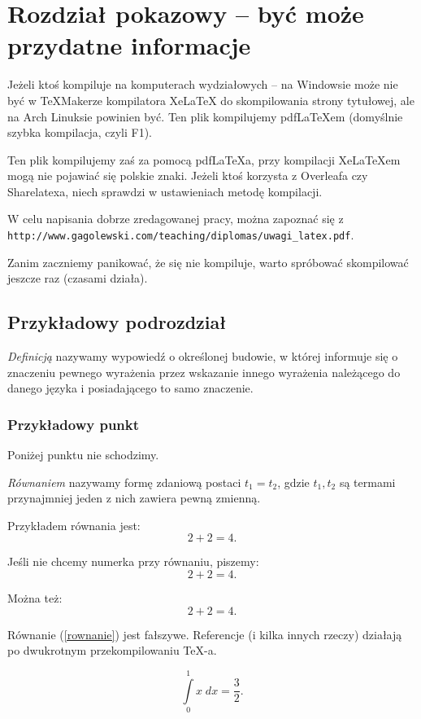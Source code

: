 \chapter{Rozdział pokazowy -- być może przydatne informacje}

Jeżeli ktoś kompiluje na komputerach wydziałowych -- na Windowsie może nie być w TeXMakerze kompilatora XeLaTeX do skompilowania strony tytułowej, ale na Arch Linuksie powinien być. Ten plik kompilujemy pdfLaTeXem (domyślnie szybka kompilacja, czyli F1).

Ten plik kompilujemy zaś za pomocą pdfLaTeXa, przy kompilacji XeLaTeXem mogą nie pojawiać się polskie znaki. Jeżeli ktoś korzysta z Overleafa czy Sharelatexa, niech sprawdzi w ustawieniach metodę kompilacji.

W celu napisania dobrze zredagowanej pracy, można zapoznać się z \texttt{http://www.gagolewski.com/teaching/diplomas/uwagi\_latex.pdf}.

Zanim zaczniemy panikować, że się nie kompiluje, warto spróbować skompilować jeszcze raz (czasami działa).


\section{Przykładowy podrozdział}

\begin{definition}[Definicja]
\textit{Definicją} nazywamy wypowiedź o określonej budowie, w której informuje się o znaczeniu pewnego wyrażenia przez wskazanie innego wyrażenia należącego do danego języka i posiadającego to samo znaczenie.
\end{definition}

\subsection{Przykładowy punkt}

Poniżej punktu nie schodzimy.

\begin{definition}[Równanie]
\textit{Równaniem} nazywamy formę zdaniową postaci $t_1 = t_2$, gdzie $t_1, t_2$ są termami przynajmniej jeden z nich zawiera pewną zmienną.
\end{definition}

\begin{example}
Przykładem równania jest:
\begin{equation}
2+2=4.
\end{equation}

Jeśli nie chcemy numerka przy równaniu, piszemy:
\begin{equation*}
2+2=4.
\end{equation*}

Można też:
\[
2+2=4.
\]

Równanie (\ref{rownanie}) jest fałszywe. Referencje (i kilka innych rzeczy) działają po dwukrotnym przekompilowaniu \TeX -a.

\begin{equation}\label{rownanie}
\int \limits_{0}^{1} x \; dx = \frac{3}{2}.
\end{equation}

\end{example}

